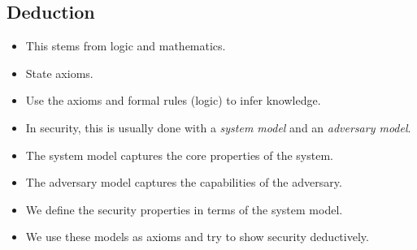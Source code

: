 \subsection{Deduction}

\begin{frame}
  \begin{definition}[Deduction]
    \begin{itemize}
      \item This stems from logic and mathematics.
      \item State axioms.
      \item Use the axioms and formal rules (logic) to infer knowledge.
    \end{itemize}
  \end{definition}
\end{frame}

\begin{frame}
  \begin{itemize}
    \item In security, this is usually done with a \emph{system model} and an 
      \emph{adversary model}.
  \end{itemize}

  \pause

  \begin{definition}
    \begin{itemize}
      \item The system model captures the core properties of the system.
      \item The adversary model captures the capabilities of the adversary.
    \end{itemize}
  \end{definition}

  \pause

  \begin{itemize}
    \item We define the security properties in terms of the system model.
    \item We use these models as axioms and try to show security deductively.
  \end{itemize}
\end{frame}

